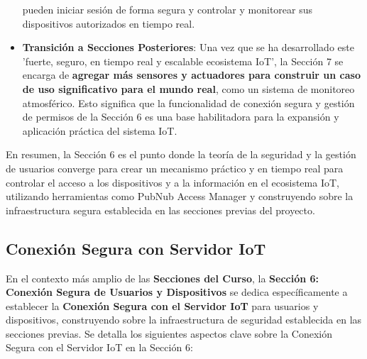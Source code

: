 \documentclass{report}
\begin{document}
\begin{itemize}
    pueden iniciar sesión de forma segura y controlar y monitorear sus dispositivos autorizados en tiempo real.
    \item \textbf{Transición a Secciones Posteriores}: Una vez que se ha desarrollado este  'fuerte, seguro, en tiempo real y escalable ecosistema IoT', 
    la Sección 7 se encarga de \textbf{agregar más sensores y actuadores para construir un caso de uso significativo para el mundo real}, como un 
    sistema de monitoreo atmosférico. Esto significa que la funcionalidad de conexión segura y gestión de permisos de la Sección 6 es una base 
    habilitadora para la expansión y aplicación práctica del sistema IoT.
\end{itemize}
En resumen, la Sección 6 es el punto donde la teoría de la seguridad y la gestión de usuarios converge para crear un mecanismo práctico y en tiempo 
real para controlar el acceso a los dispositivos y a la información en el ecosistema IoT, utilizando herramientas como PubNub Access Manager y 
construyendo sobre la infraestructura segura establecida en las secciones previas del proyecto.

\subsection{Conexión Segura con Servidor IoT}
En el contexto más amplio de las \textbf{Secciones del Curso}, la \textbf{Sección 6: Conexión Segura de Usuarios y Dispositivos} se dedica específicamente 
a establecer la \textbf{Conexión Segura con el Servidor IoT} para usuarios y dispositivos, construyendo sobre la infraestructura de seguridad establecida 
en las secciones previas. Se detalla los siguientes aspectos clave sobre la Conexión Segura con el Servidor IoT en la Sección 6:
\end{document}
